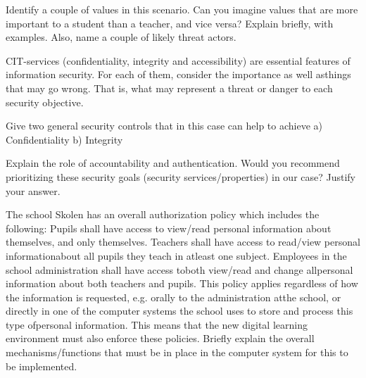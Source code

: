 \documentclass{myassignment}
\begin{document}
	\begin{problem}
		Identify a couple of values in this scenario. Can you imagine values that are more important to a student than a teacher, and vice versa? Explain briefly, with examples. Also, name a couple of likely threat actors.
	\end{problem}

	\begin{answer}
		
	\end{answer}

	\begin{problem}
		CIT-services (confidentiality, integrity and accessibility) are essential features of information security. For each of them, consider the importance as well asthings that may go wrong. That is, what may represent a threat or danger to each security objective.
	\end{problem}

	\begin{answer}
		
	\end{answer}

	\begin{problem}
		Give two general security controls that in this case can help to achieve
			a) Confidentiality
			b) Integrity
	\end{problem}

	\begin{answer}

	\end{answer}

	\begin{problem}
		Explain the role of accountability and authentication. Would you recommend prioritizing these security goals (security services/properties) in our case? Justify your answer.
	\end{problem}

	\begin{answer}

	\end{answer}

	\begin{problem}
		The school Skolen has an overall authorization policy which includes the following:
			Pupils shall have access to view/read personal information about themselves, and only themselves.
			Teachers shall have access to read/view personal informationabout all pupils they teach in atleast one subject.
			Employees in the school administration shall have access toboth view/read and change allpersonal information about both teachers and pupils.
		This policy applies regardless of how the information is requested, e.g. orally to the administration atthe school, or directly in one of the computer systems the school uses to store and process this type ofpersonal information. This means that the new digital learning environment must also enforce these policies. Briefly explain the overall mechanisms/functions that must be in place in the computer system for this to be implemented.
	\end{problem}
\end{document}
